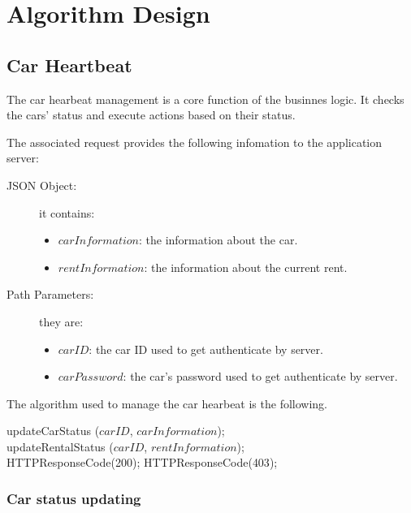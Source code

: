\section{Algorithm Design} \label{sec algorithm design}

\subsection{Car Heartbeat}

The car hearbeat management is a core function of the businnes logic. It checks the cars' status and execute actions based on their status.
 
The associated request provides the following infomation to the application server:
\begin{description}
\item [JSON Object:] it contains:
	\begin{itemize}
		\item $carInformation$: the information about the car.
		\item $rentInformation$: the information about the current rent.
	\end{itemize}
\item [Path Parameters:] they are:
	\begin{itemize}
		\item $carID$: the car ID used to get authenticate by server.
		\item $carPassword$: the car's password used to get authenticate by server.
	\end{itemize}
\end{description}
The algorithm used to manage the car hearbeat is the following.

\bigskip

\begin{algorithm}[H]
\small
	{
		{\color{green} updateCarStatus} ($carID$, $carInformation$); \\
		{
			{\color{green} updateRentalStatus} ($carID$, $rentInformation$); \\
		}
		HTTPResponseCode({\color{red}200});
	}
	{
		HTTPResponseCode({\color{red}403});
	}
\end{algorithm}

\subsubsection{Car status updating}


